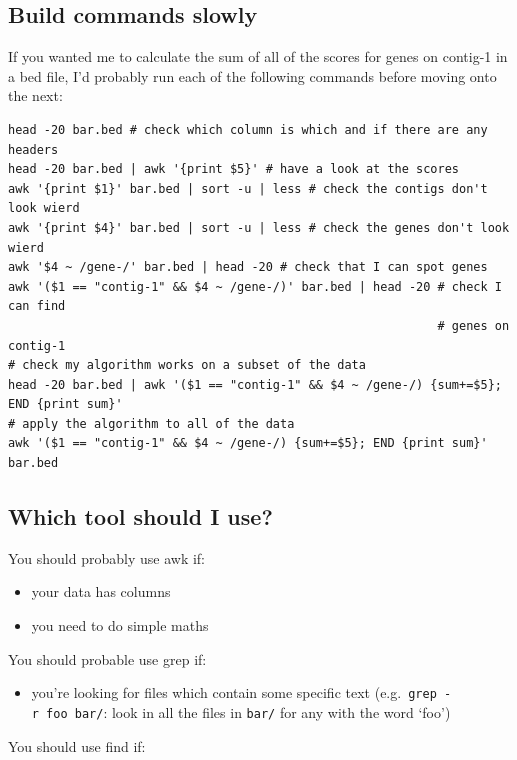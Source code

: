 \documentclass[11pt]{article}
\providecommand{\tightlist}{%
      \setlength{\itemsep}{0pt}\setlength{\parskip}{0pt}}
\begin{document}
\hypertarget{build-commands-slowly}{%
\subsection{Build commands slowly}\label{build-commands-slowly}}

If you wanted me to calculate the sum of all of the scores for genes on
contig-1 in a bed file, I'd probably run each of the following commands
before moving onto the next:

\begin{verbatim}
head -20 bar.bed # check which column is which and if there are any headers
head -20 bar.bed | awk '{print $5}' # have a look at the scores
awk '{print $1}' bar.bed | sort -u | less # check the contigs don't look wierd
awk '{print $4}' bar.bed | sort -u | less # check the genes don't look wierd
awk '$4 ~ /gene-/' bar.bed | head -20 # check that I can spot genes
awk '($1 == "contig-1" && $4 ~ /gene-/)' bar.bed | head -20 # check I can find
                                                            # genes on contig-1
# check my algorithm works on a subset of the data
head -20 bar.bed | awk '($1 == "contig-1" && $4 ~ /gene-/) {sum+=$5}; END {print sum}'
# apply the algorithm to all of the data
awk '($1 == "contig-1" && $4 ~ /gene-/) {sum+=$5}; END {print sum}' bar.bed
\end{verbatim}

\hypertarget{which-tool-should-i-use}{%
\subsection{Which tool should I use?}\label{which-tool-should-i-use}}

You should probably use awk if:

\begin{itemize}
\tightlist
\item
  your data has columns
\item
  you need to do simple maths
\end{itemize}

You should probable use grep if:

\begin{itemize}
\tightlist
\item
  you're looking for files which contain some specific text
  (e.g.~\texttt{grep\ -r\ foo\ bar/}: look in all the files in
  \texttt{bar/} for any with the word `foo')
\end{itemize}

You should use find if:
\end{document}

